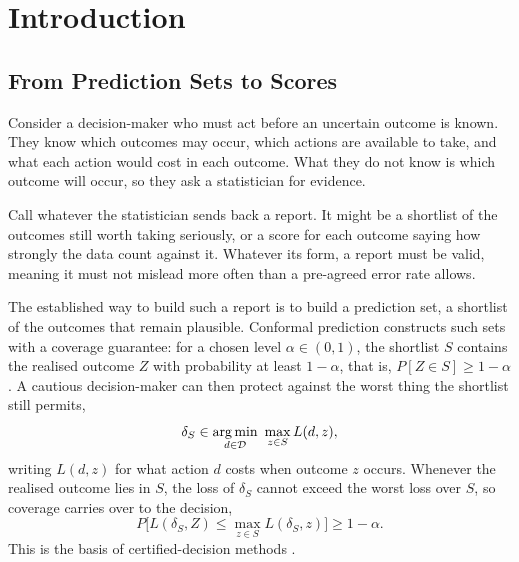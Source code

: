 \section{Introduction}\label{sec:introduction}

\subsection{From Prediction Sets to Scores}\label{sec:intro_sets}

Consider a decision-maker who must act before an uncertain outcome is known.
They know which outcomes may occur, which actions are available to take, and what each
action would cost in each outcome. What they do not know is which outcome will
occur, so they ask a statistician for evidence.

Call whatever the statistician sends back a report. It might be a shortlist of
the outcomes still worth taking seriously, or a score for each outcome saying
how strongly the data count against it. Whatever its form, a report must be
valid, meaning it must not mislead more often than a pre-agreed error rate allows.

The established way to build such a report is to build a
prediction set, a shortlist of the outcomes that remain plausible. Conformal
prediction constructs such sets with a coverage guarantee: for a chosen level
$\alpha\in(0,1)$, the shortlist $S$ contains the realised outcome $Z$ with
probability at least $1-\alpha$, that is, $P[Z\in S]\geq1-\alpha$
\citep{vovk2005,angelopoulos2023conformal}. A cautious decision-maker can then
protect against the worst thing the shortlist still permits,
\begin{equation}
  \delta_S\in\operatorname*{arg\,min}_{d\in\mathcal D}\ \max_{z\in S}L(d,z),
  \label{eq:intro_set_rule}
\end{equation}
writing $L(d,z)$ for what action $d$ costs when outcome $z$ occurs. Whenever
the realised outcome lies in $S$, the loss of $\delta_S$ cannot exceed the
worst loss over $S$, so coverage carries over to the decision,
\begin{equation}
  P\Big[L(\delta_S,Z)\leq\max_{z\in S}L(\delta_S,z)\Big]\geq1-\alpha .
  \label{eq:intro_set_guarantee}
\end{equation}
This is the basis of certified-decision methods
\citep{AndrewsChen2025,Kiyani2025}.

